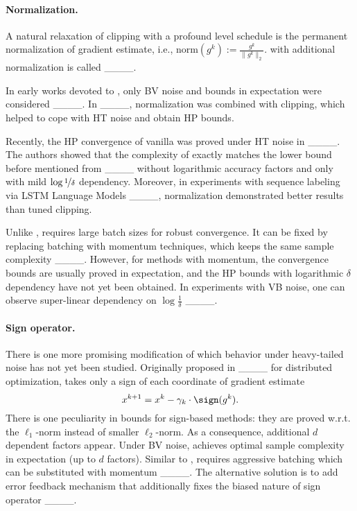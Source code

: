 \paragraph{Normalization.}
A natural relaxation of clipping with a profound level schedule is the permanent normalization of gradient estimate, i.e., $\text{norm}(g^k) := \frac{g^k}{\|g^k\|_2}.$  with additional normalization is called  ____.


In early works devoted to , only BV noise and bounds in expectation were considered ____. In ____, normalization was combined with clipping, which helped to cope with HT noise and obtain HP bounds.

Recently, the HP convergence of vanilla  was proved under HT noise in ____. The authors showed that the complexity of  exactly matches the lower bound before mentioned from ____ without logarithmic accuracy factors and only with mild $\log\nicefrac{1}{\delta}$ dependency. Moreover, in experiments with sequence labeling via LSTM Language Models ____, normalization demonstrated better results than tuned clipping.  

Unlike ,  requires large batch sizes for robust convergence. It can be fixed by replacing batching with momentum techniques, which keeps the same sample complexity ____. However, for methods with momentum, the convergence bounds are usually proved in expectation, and the HP bounds with logarithmic $\delta$ dependency have not yet been obtained. In experiments with VB noise, one can observe super-linear dependency on $\log \frac{1}{\delta}$ ____.

\paragraph{Sign operator.} There is one more promising modification of  which behavior under heavy-tailed noise has not yet been studied. Originally proposed in ____ for distributed optimization,  takes only a sign of each coordinate of gradient estimate $$x^{k+1} = x^k - \gamma_k \cdot \sign(g^k).$$ There is one peculiarity in bounds for sign-based methods: they are proved w.r.t. the $\ell_1$-norm instead of smaller $\ell_2$-norm. As a consequence, additional $d$ dependent factors appear.  
Under BV noise,  achieves optimal sample complexity in expectation (up to $d$ factors). Similar to ,  requires aggressive batching which can be substituted with momentum ____. The alternative solution is to add error feedback mechanism that additionally fixes the biased nature of sign operator ____.

